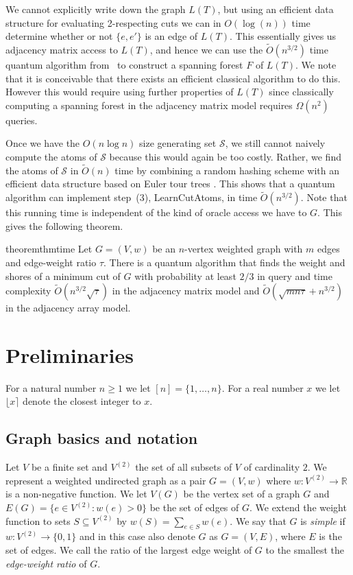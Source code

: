 \documentclass[10pt,a4paper]{article}
\newcommand{\R}{\mathbb{R}}
\newcommand{\Scal}{\mathcal{S}}
\newcommand{\tO}{\tilde O}
\newcommand{\1}{\mathbf{1}}
\theoremstyle{definition}
\begin{document}
We cannot explicitly write down the graph $L(T)$, but using an efficient data structure for evaluating 2-respecting cuts \cite{MN20,GMW20c} we can in $O(\log(n))$ time determine 
whether or not $\{e,e'\}$ is an edge of $L(T)$.
This essentially gives us adjacency matrix access to $L(T)$, and hence we can use the $\tO(n^{3/2})$ time quantum algorithm from~\cite{DHHM06} to construct a spanning forest $F$ of $L(T)$.
We note that it is conceivable that there exists an efficient classical algorithm to do this.
However this would require using further properties of $L(T)$ since classically computing a spanning forest in the adjacency matrix model requires $\Omega(n^2)$ queries.

Once we have the $O(n \log n)$ size generating set $\Scal$, we still cannot naively compute the atoms of $\Scal$ because this would again be too costly.
Rather, we find the atoms of $\Scal$ in $\tO(n)$ time by combining a random hashing scheme with an efficient data structure based on Euler tour trees \cite{HK95}.
This shows that a quantum algorithm can implement step~(3), LearnCutAtoms, in time $\tO(n^{3/2})$.  Note that this running time is independent of the kind of oracle access we have to $G$.  
This gives the following theorem.


\begin{restatable}{theorem}{thmtime} \label{thm:time}
Let $G =(V,w)$ be an $n$-vertex weighted graph with $m$ edges and edge-weight ratio $\tau$.  There is a quantum algorithm that finds the weight and shores of a minimum cut of $G$ with probability at least 
$2/3$ in query and time complexity $\tO(n^{3/2}\sqrt{\tau})$ in the adjacency matrix model and $\tO(\sqrt{mn\tau} + n^{3/2})$ in the adjacency array model.
\end{restatable}

\section{Preliminaries}
For a natural number $n \ge 1$ we let $[n] = \{1, \ldots, n\}$.  For a real number $x$ we let $\lfloor x \rceil$ denote the closest integer to $x$.

\subsection{Graph basics and notation}
Let $V$ be a finite set and $V^{(2)}$ the set of all subsets of $V$ of cardinality $2$.  We represent a weighted undirected 
graph as a pair $G = (V,w)$ where $w: V^{(2)} \rightarrow \R$ is a non-negative function.  We let $V(G)$ be the vertex set of a graph $G$ and 
$E(G) = \{ e \in V^{(2)}: w(e) > 0\}$ be the set of edges of $G$.  We extend the weight function to sets $S \subseteq V^{(2)}$ by $w(S) = \sum_{e \in S} w(e)$.
We say that $G$ is \emph{simple} if $w: V^{(2)} \rightarrow \{0,1\}$ and in this case also denote $G$ as $G = (V,E)$, where $E$ is the set of edges.  We call the 
ratio of the largest edge weight of $G$ to the smallest the \emph{edge-weight ratio} of $G$.
\end{document}
